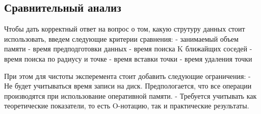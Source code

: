 \subsection{Сравнительный анализ}
Чтобы дать корректный ответ на вопрос о том, какую струтуру данных стоит использовать, введем следующие критерии сравнения:
- занимаемый объем памяти
- время предподготовки данных
- время поиска K ближайщих соседей
- время поиска по радиусу и точке
- время вставки точки
- время удаления точки

При этом для чистоты эксперемента стоит добавить следующие ограничения:
- Не будет учитываться время записи на диск. Предпологается, что все операции производятся при использование оперативной памяти.
- Требуется учитывать как теоретические показатели, то есть O-нотацию, так и практические результаты.


